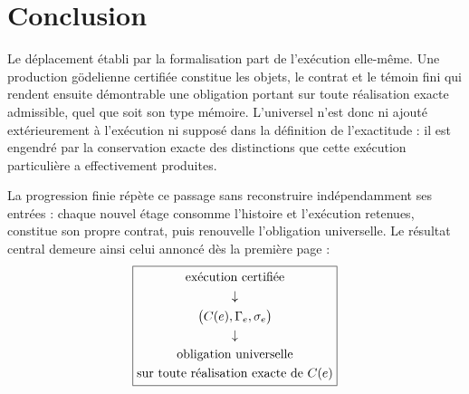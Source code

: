 \documentclass[11pt,a4paper]{article}
\newcommand{\MainAxis}{%
  \begin{gathered}
  \text{exécution certifiée}\\
  \downarrow\\
  \bigl(C(e),\Gamma_e,\sigma_e\bigr)\\
  \downarrow\\
  \text{obligation universelle}\\
  \text{sur toute réalisation exacte de }C(e)
  \end{gathered}}
\theoremstyle{remark}
\begin{document}
\section{Conclusion}

Le déplacement établi par la formalisation part de l'exécution elle-même.
Une production gödelienne certifiée constitue les objets, le contrat et le
témoin fini qui rendent ensuite démontrable une obligation portant sur toute
réalisation exacte admissible, quel que soit son type mémoire. L'universel
n'est donc ni ajouté extérieurement à l'exécution ni supposé dans la
définition de l'exactitude : il est engendré par la conservation exacte des
distinctions que cette exécution particulière a effectivement produites.

La progression finie répète ce passage sans reconstruire indépendamment ses
entrées : chaque nouvel étage consomme l'histoire et l'exécution retenues,
constitue son propre contrat, puis renouvelle l'obligation universelle. Le
résultat central demeure ainsi celui annoncé dès la première page :
\[
\boxed{\MainAxis}
\]
\end{document}
